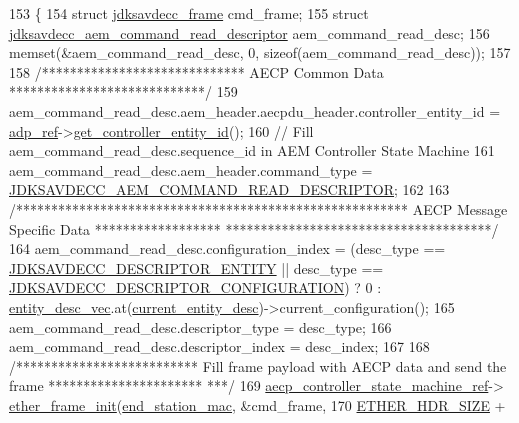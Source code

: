 \begin{DoxyCode}
153 \{
154     \textcolor{keyword}{struct }\hyperlink{structjdksavdecc__frame}{jdksavdecc\_frame} cmd\_frame;
155     \textcolor{keyword}{struct }\hyperlink{structjdksavdecc__aem__command__read__descriptor}{jdksavdecc\_aem\_command\_read\_descriptor} 
      aem\_command\_read\_desc;
156     memset(&aem\_command\_read\_desc, 0, \textcolor{keyword}{sizeof}(aem\_command\_read\_desc));
157 
158     \textcolor{comment}{/***************************** AECP Common Data ****************************/}
159     aem\_command\_read\_desc.aem\_header.aecpdu\_header.controller\_entity\_id = 
      \hyperlink{classavdecc__lib_1_1end__station__imp_a0b7b5ce956637a18c695ba20f2d4908c}{adp\_ref}->\hyperlink{classavdecc__lib_1_1adp_a0c0959a46658c0a22e9530334b2912da}{get\_controller\_entity\_id}();
160     \textcolor{comment}{// Fill aem\_command\_read\_desc.sequence\_id in AEM Controller State Machine}
161     aem\_command\_read\_desc.aem\_header.command\_type = 
      \hyperlink{group__command_gaa6a32a290cbec71466b571590b05fd00}{JDKSAVDECC\_AEM\_COMMAND\_READ\_DESCRIPTOR};
162 
163     \textcolor{comment}{/******************************************************** AECP Message Specific Data ******************
      **************************************/}
164     aem\_command\_read\_desc.configuration\_index = (desc\_type == 
      \hyperlink{group__descriptor_gaf06b7a0bf808dc8e3104511947d694c4}{JDKSAVDECC\_DESCRIPTOR\_ENTITY} || desc\_type == 
      \hyperlink{group__descriptor_ga645687847f92dc28bcb37a7c334cb875}{JDKSAVDECC\_DESCRIPTOR\_CONFIGURATION}) ? 0 : 
      \hyperlink{classavdecc__lib_1_1end__station__imp_a72edab41bc56e3c1757944a7df188a3d}{entity\_desc\_vec}.at(\hyperlink{classavdecc__lib_1_1end__station__imp_afd78c89df26ba7641e1adb764c0e827d}{current\_entity\_desc})->current\_configuration();
165     aem\_command\_read\_desc.descriptor\_type = desc\_type;
166     aem\_command\_read\_desc.descriptor\_index = desc\_index;
167 
168     \textcolor{comment}{/************************** Fill frame payload with AECP data and send the frame **********************
      ***/}
169     \hyperlink{namespaceavdecc__lib_a0b1b5aea3c0490f77cbfd9178af5be22}{aecp\_controller\_state\_machine\_ref}->
      \hyperlink{classavdecc__lib_1_1aecp__controller__state__machine_a86ff947c5e6b799cfb877d3767bfa1f9}{ether\_frame\_init}(\hyperlink{classavdecc__lib_1_1end__station__imp_a0e9fa7b31d903107ff9e7aac9dac172d}{end\_station\_mac}, &cmd\_frame,
170                                                         \hyperlink{namespaceavdecc__lib_a6c827b1a0d973e18119c5e3da518e65ca9512ad9b34302ba7048d88197e0a2dc0}{ETHER\_HDR\_SIZE} + 

\end{DoxyCode}
